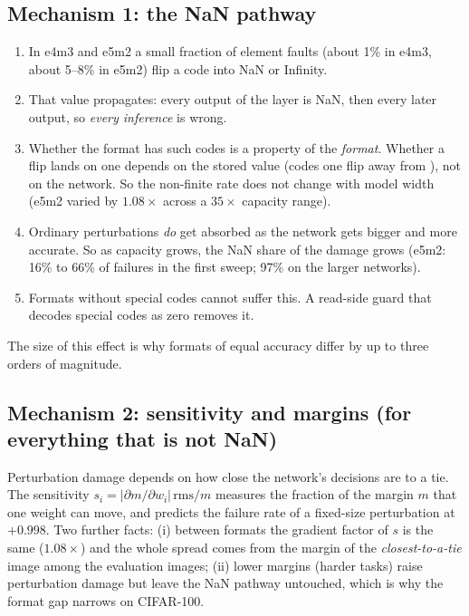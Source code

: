\subsection{Mechanism 1: the NaN pathway}
\begin{enumerate}
\item In e4m3 and e5m2 a small fraction of element faults (about 1\% in e4m3, about 5--8\% in e5m2) flip a code into NaN or Infinity.
\item That value propagates: every output of the layer is NaN, then every later output, so \emph{every inference} is wrong.
\item Whether the format has such codes is a property of the \emph{format}. Whether a flip lands on one depends on the stored value (codes one flip away from ), not on the network. So the non-finite rate does not change with model width (e5m2 varied by $1.08\times$ across a $35\times$ capacity range).
\item Ordinary perturbations \emph{do} get absorbed as the network gets bigger and more accurate. So as capacity grows, the NaN share of the damage grows (e5m2: 16\% to 66\% of failures in the first sweep; 97\% on the larger networks).
\item Formats without special codes cannot suffer this. A read-side guard that decodes special codes as zero removes it.
\end{enumerate}
The size of this effect is why formats of equal accuracy differ by up to three orders of magnitude.

\subsection{Mechanism 2: sensitivity and margins (for everything that is not NaN)}
Perturbation damage depends on how close the network's decisions are to a tie. The sensitivity $s_i=|\partial m/\partial w_i|\,\mathrm{rms}/m$ measures the fraction of the margin $m$ that one weight can move, and predicts the failure rate of a fixed-size perturbation at $+0.998$.
Two further facts: (i) between formats the gradient factor of $s$ is the same ($1.08\times$) and the whole spread comes from the margin of the \emph{closest-to-a-tie} image among the evaluation images; (ii) lower margins (harder tasks) raise perturbation damage but leave the NaN pathway untouched, which is why the format gap narrows on CIFAR-100.

